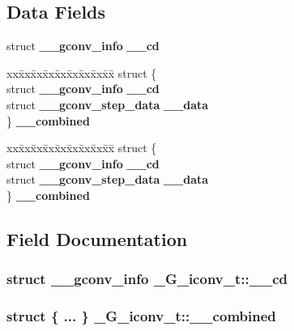 \subsection*{Data Fields}
\begin{DoxyCompactItemize}
\item 
struct {\bf \_\-\_\-gconv\_\-info} {\bf \_\-\_\-cd}
\item 
\begin{tabbing}
xx\=xx\=xx\=xx\=xx\=xx\=xx\=xx\=xx\=\kill
struct \{\\
\>struct {\bf \_\_gconv\_info} {\bf \_\_cd}\\
\>struct {\bf \_\_gconv\_step\_data} {\bf \_\_data}\\
\} {\bf \_\_combined}\\

\end{tabbing}\item 
\begin{tabbing}
xx\=xx\=xx\=xx\=xx\=xx\=xx\=xx\=xx\=\kill
struct \{\\
\>struct {\bf \_\_gconv\_info} {\bf \_\_cd}\\
\>struct {\bf \_\_gconv\_step\_data} {\bf \_\_data}\\
\} {\bf \_\_combined}\\

\end{tabbing}\end{DoxyCompactItemize}


\subsection{Field Documentation}
\subsubsection[{\_\-\_\-cd}]{\setlength{\rightskip}{0pt plus 5cm}struct {\bf \_\-\_\-gconv\_\-info} {\bf \_\-G\_\-iconv\_\-t::\_\-\_\-cd}}\label{union__G__iconv__t_a480894f5a3ea9055b81f123dec8e82f5}
\subsubsection[{\_\-\_\-combined}]{\setlength{\rightskip}{0pt plus 5cm}struct \{ ... \}   {\bf \_\-G\_\-iconv\_\-t::\_\-\_\-combined}}\label{union__G__iconv__t_a9869bb54f093091ebbd81b87576421f4}
